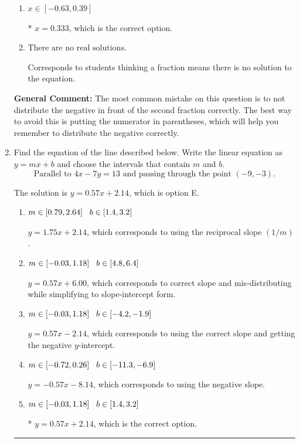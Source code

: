 \documentclass{extbook}[14pt]
\newcommand{\litem}[1]{\item #1

\rule{\textwidth}{0.4pt}}
\begin{document}
\begin{enumerate}
{\begin{enumerate}[label=\Alph*.]
$x = -1.373$, which corresponds to not distributing the negative in front of the first parentheses correctly.
\item \( x \in [-0.63, 0.39] \)

* $x = 0.333$, which is the correct option.
\item \( \text{There are no real solutions.} \)

Corresponds to students thinking a fraction means there is no solution to the equation.
\end{enumerate}

\textbf{General Comment:} The most common mistake on this question is to not distribute the negative in front of the second fraction correctly. The best way to avoid this is putting the numerator in parentheses, which will help you remember to distribute the negative correctly.
}
\litem{
Find the equation of the line described below. Write the linear equation as $ y=mx+b $ and choose the intervals that contain $m$ and $b$.
\[ \text{Parallel to } 4 x - 7 y = 13 \text{ and passing through the point } (-9, -3). \]

The solution is \( y = 0.57x + 2.14 \), which is option E.\begin{enumerate}[label=\Alph*.]
\item \( m \in [0.79, 2.64] \hspace*{3mm} b \in [1.4, 3.2] \)

 $y = 1.75x + 2.14$, which corresponds to using the reciprocal slope $(1/m)$.
\item \( m \in [-0.03, 1.18] \hspace*{3mm} b \in [4.8, 6.4] \)

 $y = 0.57x + 6.00$, which corresponds to correct slope and mis-distributing while simplifying to slope-intercept form.
\item \( m \in [-0.03, 1.18] \hspace*{3mm} b \in [-4.2, -1.9] \)

 $y = 0.57x - 2.14$, which corresponds to using the correct slope and getting the negative $y$-intercept.
\item \( m \in [-0.72, 0.26] \hspace*{3mm} b \in [-11.3, -6.9] \)

 $y = -0.57x - 8.14$, which corresponds to using the negative slope.
\item \( m \in [-0.03, 1.18] \hspace*{3mm} b \in [1.4, 3.2] \)

* $y = 0.57x + 2.14$, which is the correct option.
\end{enumerate}

}
\end{enumerate}
\end{document}
